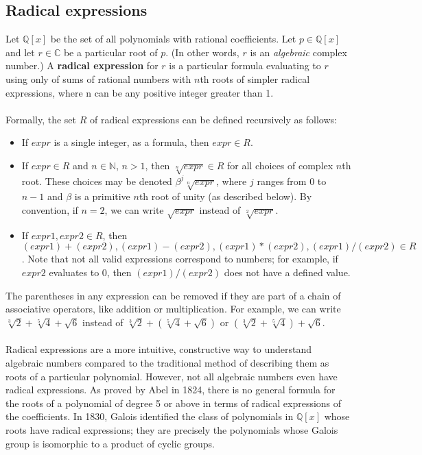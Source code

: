 \documentclass{article}
\begin{document}
    \subsection{Radical expressions}
    Let $ \mathbb{Q}[x] $ be the set of all polynomials with rational coefficients. Let $ p \in \mathbb{Q}[x] $ and let $ r \in \mathbb{C} $ be a particular root of $ p $. (In other words, $ r $ is an \textit{algebraic} complex number.) A \textbf{radical expression} for $ r $ is a particular formula evaluating to $ r $ using only of sums of rational numbers with $ n $th roots of simpler radical expressions, where n can be any positive integer greater than 1.\\
    \\
    Formally, the set $ R $ of radical expressions can be defined recursively as follows:
    \begin{itemize}
        \item If $ expr $ is a single integer, as a formula, then $ expr \in R $.
        \item If $ expr \in R $ and $ n \in \mathbb{N} $, $ n > 1 $, then $ \sqrt[n]{expr} \in R $ for all choices of complex $ n $th root. These choices may be denoted $ \beta^j \sqrt[n]{expr} $, where $ j $ ranges from $ 0 $ to $ n - 1 $ and $ \beta $ is a primitive $ n $th root of unity (as described below). By convention, if $ n = 2 $, we can write $ \sqrt{expr} $ instead of $ \sqrt[2]{expr} $.
        \item If $ expr1, expr2 \in R $, then $ (expr1) + (expr2), (expr1) - (expr2), (expr1)*(expr2), (expr1)/(expr2) \in R $. Note that not all valid expressions correspond to numbers; for example, if $ expr2 $ evaluates to 0, then $ (expr1)/(expr2) $ does not have a defined value.
    \end{itemize}
    The parentheses in any expression can be removed if they are part of a chain of associative operators, like addition or multiplication. For example, we can write $ \sqrt[3]{2} + \sqrt[5]{4} + \sqrt{6} $ instead of $ \sqrt[3]{2} + (\sqrt[5]{4} + \sqrt{6}) $ or $ (\sqrt[3]{2} + \sqrt[5]{4}) + \sqrt{6} $.\\
    \\
    Radical expressions are a more intuitive, constructive way to understand algebraic numbers compared to the traditional method of describing them as roots of a particular polynomial. However, not all algebraic numbers even have radical expressions. As proved by Abel in 1824, there is no general formula for the roots of a polynomial of degree 5 or above in terms of radical expressions of the coefficients. In 1830, Galois identified the class of polynomials in $ \mathbb{Q}[x] $ whose roots have radical expressions; they are precisely the polynomials whose Galois group is isomorphic to a product of cyclic groups.\\
\end{document}
